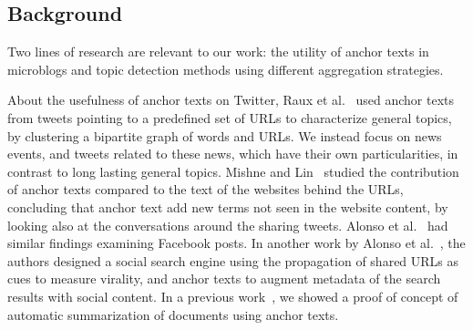 \subsection{Background}\label{sec:related}

Two lines of research are relevant to our work: the utility of anchor texts in
microblogs and topic detection methods using different aggregation strategies. 


%
About the usefulness of anchor texts on Twitter, Raux et
al.~\cite{raux2011describing} used anchor texts from tweets pointing to a
predefined set of URLs to characterize general topics, by clustering a bipartite
graph of words and URLs. 
%
We instead focus on news events, and tweets related to these news, which have
their own particularities, in contrast to long lasting general topics. 
%
Mishne and Lin~\cite{mishne2012twanchor} studied the contribution of anchor
texts compared to the text of the websites behind the URLs, concluding that
anchor text add new terms not seen in the website content, by looking also at
the conversations around the sharing tweets. 
%
Alonso et al.~\cite{Alonso:2015:WCW:2740908.2745397} had similar findings
examining Facebook posts. 
%
In another work by Alonso et al.~\cite{Alonso:2017:WHH:3091478.3091484}, the
authors designed a social search engine using the propagation of shared URLs as
cues to measure virality, and anchor texts to augment metadata of the search
results with social content. 
%
In a previous work~\cite{quezada2013understanding}, we showed a proof of concept
of automatic summarization of documents using anchor texts.
%


